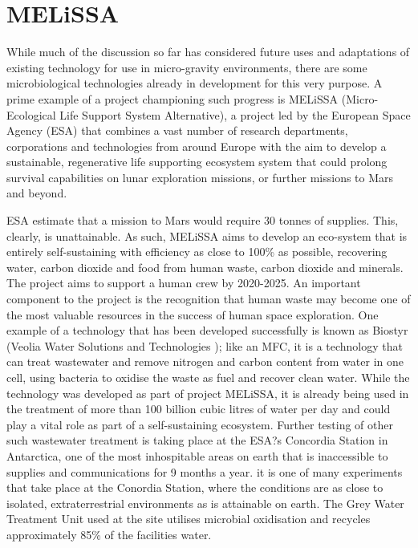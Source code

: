 \documentclass[12pt]{article}
\begin{document}
\section{MELiSSA}

While much of the discussion so far has considered future uses and adaptations of existing technology for use in micro-gravity environments, there are some microbiological technologies already in development for this very purpose. A prime example of a project championing such progress is MELiSSA (Micro-Ecological Life Support System Alternative), a project led by the European Space Agency (ESA) that combines a vast number of research departments, corporations and technologies from around Europe with the aim to develop a sustainable, regenerative life supporting ecosystem system that could prolong survival capabilities on lunar exploration missions, or further missions to Mars and beyond. \cite{agency2008melissa} 

ESA estimate that a mission to Mars would require 30 tonnes of supplies. This, clearly, is unattainable. As such, MELiSSA aims to develop an eco-system that is entirely self-sustaining with efficiency as close to 100\% as possible, recovering water, carbon dioxide and food from human waste, carbon dioxide and minerals. The project aims to support a human crew by 2020-2025. An important component to the project is the recognition that human waste may become one of the most valuable resources in the success of human space exploration. One example of a technology that has been developed successfully is known as Biostyr (Veolia Water Solutions and Technologies \cite{veolia}); like an MFC, it is a technology that can treat wastewater and remove nitrogen and carbon content from water in one cell, using bacteria to oxidise the waste as fuel and recover clean water. While the technology was developed as part of project MELiSSA, it is already being used in the treatment of more than 100 billion cubic litres of water per day and could play a vital role as part of a self-sustaining ecosystem. \cite{veolia} Further testing of other such wastewater treatment is taking place at the ESA?s Concordia Station in Antarctica, one of the most inhospitable areas on earth that is inaccessible to supplies and communications for 9 months a year. it is one of many experiments that take place at the Conordia Station, where the conditions are as close to isolated, extraterrestrial environments as is attainable on earth. The Grey Water Treatment Unit used at the site utilises microbial oxidisation and recycles approximately 85\% of the facilities water.\cite{salam2009coldest}
\end{document}
